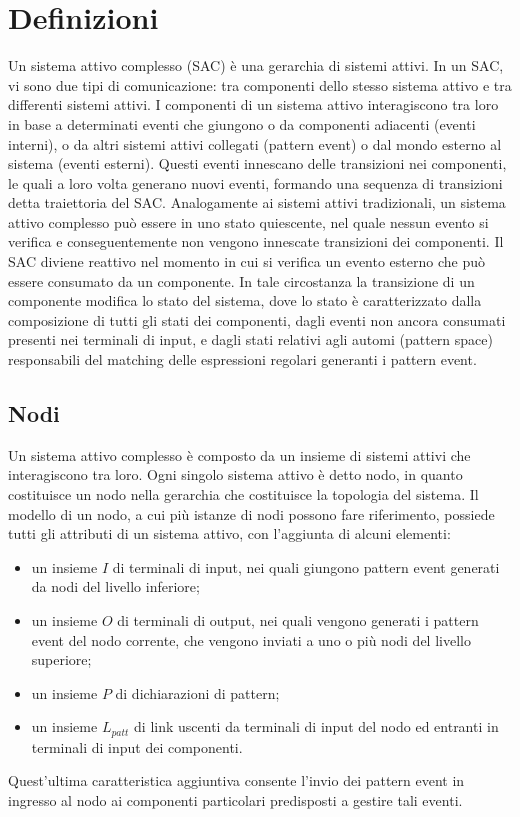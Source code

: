\section{Definizioni}
Un sistema attivo complesso (SAC) è una gerarchia di sistemi attivi. In un SAC, vi sono due tipi di comunicazione: tra componenti dello stesso sistema attivo e tra differenti sistemi attivi. 
I componenti di un sistema attivo interagiscono tra loro in base a determinati eventi che giungono o da componenti adiacenti (eventi interni), o da altri sistemi attivi collegati (pattern event) o dal mondo esterno al sistema (eventi esterni). Questi eventi innescano delle transizioni nei componenti, le quali a loro volta generano nuovi eventi, formando una sequenza di transizioni detta traiettoria del SAC.
Analogamente ai sistemi attivi tradizionali, un sistema attivo complesso può essere in uno stato quiescente, nel quale nessun evento si verifica e conseguentemente non vengono innescate transizioni dei componenti.
Il SAC diviene reattivo nel momento in cui si verifica un evento esterno che può essere consumato da un componente. In tale circostanza la transizione di un componente modifica lo stato del sistema, dove lo stato è caratterizzato dalla composizione di tutti gli stati dei componenti, dagli eventi non ancora consumati presenti nei terminali di input, e dagli stati relativi agli automi (pattern space) responsabili del matching delle espressioni regolari generanti i pattern event. 

\subsection{Nodi}
Un sistema attivo complesso è composto da un insieme di sistemi attivi che interagiscono tra loro. Ogni singolo sistema attivo è detto nodo, in quanto costituisce un nodo nella gerarchia che costituisce la topologia del sistema.
Il modello di un nodo, a cui più istanze di nodi possono fare riferimento, possiede tutti gli attributi di un sistema attivo, con l'aggiunta di alcuni elementi:
\begin{itemize}
\item un insieme $I$ di terminali di input, nei quali giungono pattern event generati da nodi del livello inferiore;
\item un insieme $O$ di terminali di output, nei quali vengono generati i pattern event del nodo corrente, che vengono inviati a uno o più nodi del livello superiore;
\item un insieme $P$ di dichiarazioni di pattern;
\item un insieme $L_{patt}$ di link uscenti da terminali di input del nodo ed entranti in terminali di input dei componenti.
\end{itemize}
Quest'ultima caratteristica aggiuntiva consente l'invio dei pattern event in ingresso al nodo ai componenti particolari predisposti a gestire tali eventi.

